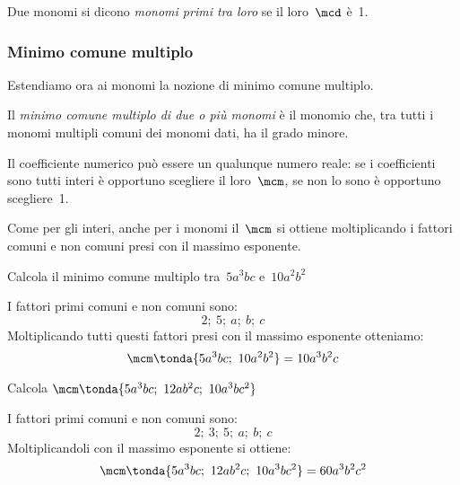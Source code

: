 \begin{definizione}
 Due monomi si dicono \emph{monomi primi tra loro} se il loro~\(\mcd\) è~1.
\end{definizione}

\subsubsection{Minimo comune multiplo}

Estendiamo ora ai monomi la nozione di minimo comune multiplo.

\begin{definizione}
 Il \emph{minimo comune multiplo di due o più monomi}
è il monomio che, tra tutti i monomi multipli comuni dei monomi dati,
ha il grado minore.
\end{definizione}

Il coefficiente numerico può essere un qualunque numero reale: se i
coefficienti sono tutti interi è opportuno scegliere il loro~\(\mcm\),
se non lo sono è opportuno scegliere~1.

Come per gli interi, anche per i monomi il~\(\mcm\) si ottiene moltiplicando 
i fattori comuni e non comuni presi con il massimo esponente.

 \begin{esempio}
Calcola il minimo comune multiplo tra~\(5a^{3}bc\) e~\(10a^{2}b^{2}\) 

I fattori primi comuni e non comuni sono:
\[2;~5;~a;~b;~c\]
Moltiplicando tutti questi fattori presi con il massimo esponente otteniamo:
\[\mcm\tonda{5a^{3}bc;~10a^{2}b^{2}} = 10a^{3}b^{2}c\]
 \end{esempio}
% 
% 
% 
% 
 \begin{esempio}
Calcola \(\mcm \tonda{5a^{3}bc;~12ab^{2}c;~10a^{3}bc^{2}}\)

I fattori primi comuni e non comuni sono:
\[2;~3;~5;~a;~b;~c\]
Moltiplicandoli con il massimo esponente si ottiene:
\[\mcm \tonda{5a^{3}bc;~12ab^{2}c;~10a^{3}bc^{2}} = 60a^{3}b^{2}c^{2}\]
 \end{esempio}

